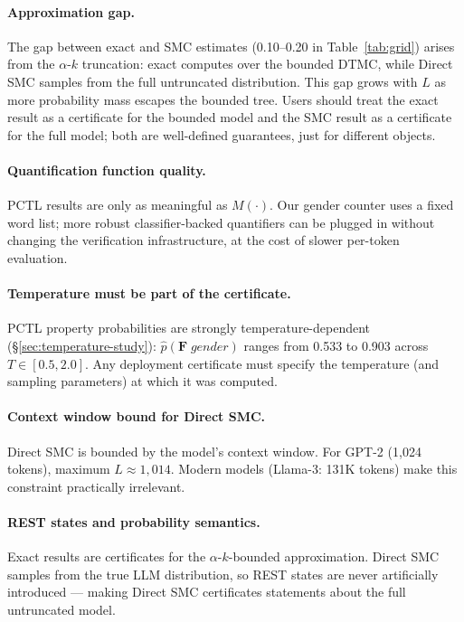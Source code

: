 \documentclass{article}
\begin{document}
\paragraph{Approximation gap.}
The gap between exact and SMC estimates (0.10--0.20 in Table~\ref{tab:grid})
arises from the $\alpha$-$k$ truncation: exact computes over the bounded DTMC,
while Direct SMC samples from the full untruncated distribution.
This gap grows with $L$ as more probability mass escapes the bounded tree.
Users should treat the exact result as a certificate for the bounded model and
the SMC result as a certificate for the full model; both are well-defined
guarantees, just for different objects.

\paragraph{Quantification function quality.}
PCTL results are only as meaningful as $M(\cdot)$.
Our gender counter uses a fixed word list; more robust classifier-backed
quantifiers can be plugged in without changing the verification infrastructure,
at the cost of slower per-token evaluation.

\paragraph{Temperature must be part of the certificate.}
PCTL property probabilities are strongly temperature-dependent
(\S\ref{sec:temperature-study}): $\hat{p}(\mathbf{F}\;\textit{gender})$ ranges
from 0.533 to 0.903 across $T{\in}[0.5, 2.0]$.
Any deployment certificate must specify the temperature (and sampling
parameters) at which it was computed.

\paragraph{Context window bound for Direct SMC.}
Direct SMC is bounded by the model's context window.
For GPT-2 (1{,}024 tokens), maximum $L{\approx}1{,}014$.
Modern models (Llama-3: 131K tokens) make this constraint practically
irrelevant.

\paragraph{REST states and probability semantics.}
Exact results are certificates for the $\alpha$-$k$-bounded approximation.
Direct SMC samples from the true LLM distribution, so REST states are never
artificially introduced — making Direct SMC certificates statements about the
full untruncated model.
\end{document}
